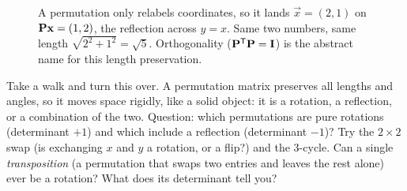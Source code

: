 \begin{figure}[H]
\centering
{}
\caption{A permutation only relabels coordinates, so it lands $\vec{x}=(2,1)$ on
$\mathbf{P}\mathbf{x}=(1,2)$, the reflection across $y=x$. Same two numbers, same length
$\sqrt{2^2+1^2}=\sqrt5$. Orthogonality ($\mathbf{P}^{\mathsf{T}}\mathbf{P}=\mathbf{I}$) is the abstract name for this
length preservation.}
\label{ch10:fig-isometry}
\end{figure}

\begin{walkbox}
Take a walk and turn this over. A permutation matrix preserves all lengths and angles, so it moves
space rigidly, like a solid object: it is a rotation, a reflection, or a combination of the two.
Question: which permutations are pure rotations (determinant $+1$) and which include a reflection
(determinant $-1$)? Try the $2\times 2$ swap (is exchanging $x$ and $y$ a rotation, or a flip?) and
the $3$-cycle. Can a single \emph{transposition} (a permutation that swaps two entries and leaves
the rest alone) ever be a rotation? What does its determinant tell you?
\end{walkbox}

